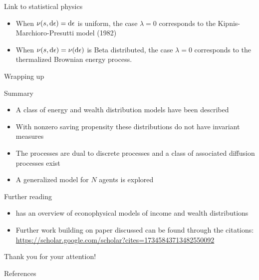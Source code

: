 \documentclass[9pt]{beamer}
\begin{document}
\begin{frame}{Link to statistical physics}
\begin{itemize}
    \item When $\nu(s, \mathop{}\!\mathrm{d} \epsilon) = \mathop{}\!\mathrm{d}\epsilon$ is uniform, the case $\lambda=0$ corresponds to the Kipnis-Marchioro-Presutti model (1982)
    \item When $\nu(s, \mathop{}\!\mathrm{d} \epsilon) = \nu(\mathop{}\!\mathrm{d}\epsilon)$ is Beta distributed, the case $\lambda=0$ corresponds to the thermalized Brownian energy process.
\end{itemize}
\end{frame}




\begin{frame}{Wrapping up}
  \begin{block}{Summary}
    \begin{itemize}
    \item A class of energy and wealth distribution models have been described
    \item With nonzero saving propensity these distributions do not have invariant measures
    \item The processes are dual to discrete processes and a class of associated diffusion processes exist
    \item A generalized model for $N$ agents is explored
    \end{itemize}
  \end{block}
  \begin{block}{Further reading}
    \begin{itemize}
    \item {} has an overview of econophysical models of income and wealth distributions
    \item Further work building on paper discussed can be found through the citations: \url{https://scholar.google.com/scholar?cites=17345843713482550092}
    \end{itemize}
  \end{block}
  \pause
  \begin{center}
  \huge{
  Thank you for your attention!
  }
  \end{center}
\end{frame}

\begin{frame}[allowframebreaks]{References}

%   
%   
  \printbibliography
\end{frame}
\end{document}
